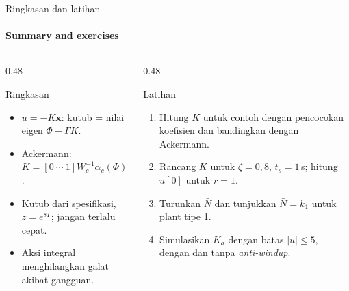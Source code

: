 \documentclass[aspectratio=169,10pt]{beamer}
\begin{document}
\begin{frame}{Ringkasan dan latihan}
	\framesubtitle{Summary and exercises}
	\begin{columns}[T]
		\begin{column}{0.48\textwidth}
			\begin{block}{Ringkasan}
				\small
				\begin{itemize}
					\item $u = -K\mathbf{x}$: kutub = nilai eigen $\Phi - \Gamma K$.
					\item Ackermann: $K = [0\ \cdots\ 1]W_c^{-1}\alpha_c(\Phi)$.
					\item Kutub dari spesifikasi, $z = e^{sT}$; jangan terlalu cepat.
					\item Aksi integral menghilangkan galat akibat gangguan.
				\end{itemize}
			\end{block}
		\end{column}
		\begin{column}{0.48\textwidth}
			\begin{exampleblock}{Latihan}
				\small
				\begin{enumerate}
					\item Hitung $K$ untuk contoh dengan pencocokan koefisien dan bandingkan dengan Ackermann.
					\item Rancang $K$ untuk $\zeta = 0{,}8$, $t_s = 1$\,s; hitung $u[0]$ untuk $r = 1$.
					\item Turunkan $\bar N$ dan tunjukkan $\bar N = k_1$ untuk plant tipe 1.
					\item Simulasikan $K_a$ dengan batas $|u| \le 5$, dengan dan tanpa \textit{anti-windup}.
				\end{enumerate}
			\end{exampleblock}
		\end{column}
	\end{columns}
\end{frame}
\end{document}
